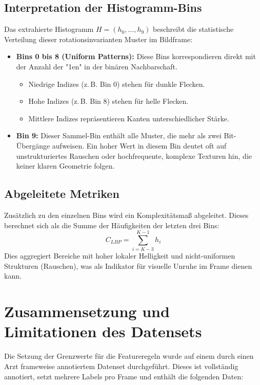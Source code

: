 \subsection{Interpretation der Histogramm-Bins}
Das extrahierte Histogramm $H = (h_0, \dots, h_9)$ beschreibt die statistische Verteilung dieser rotationsinvarianten Muster im Bildframe:
\begin{itemize}
    \item \textbf{Bins 0 bis 8 (Uniform Patterns):} Diese Bins korrespondieren direkt mit der Anzahl der "1en" in der binären Nachbarschaft.
    \begin{itemize}
        \item Niedrige Indizes (z.\,B. Bin 0) stehen für dunkle Flecken.
        \item Hohe Indizes (z.\,B. Bin 8) stehen für helle Flecken.
        \item Mittlere Indizes repräsentieren Kanten unterschiedlicher Stärke.
    \end{itemize}
    \item \textbf{Bin 9:} Dieser Sammel-Bin enthält alle Muster, die mehr als zwei Bit-Übergänge aufweisen. Ein hoher Wert in diesem Bin deutet oft auf unstrukturiertes Rauschen oder hochfrequente, komplexe Texturen hin, die keiner klaren Geometrie folgen.
\end{itemize}

\subsection{Abgeleitete Metriken}
Zusätzlich zu den einzelnen Bins wird ein Komplexitätsmaß abgeleitet. Dieses berechnet sich als die Summe der Häufigkeiten der letzten drei Bins:
\begin{equation}
    C_{LBP} = \sum_{i=K-3}^{K-1} h_i
\end{equation}
Dies aggregiert Bereiche mit hoher lokaler Helligkeit und nicht-uniformen Strukturen (Rauschen), was als Indikator für visuelle Unruhe im Frame dienen kann.



\section{Zusammensetzung und Limitationen des Datensets}

Die Setzung der Grenzwerte für die Featureregeln wurde auf einem durch einen Arzt frameweise annotiertem Datenset durchgeführt. Dieses ist vollständig annotiert, setzt mehrere Labels pro Frame und enthält die folgenden Daten:

